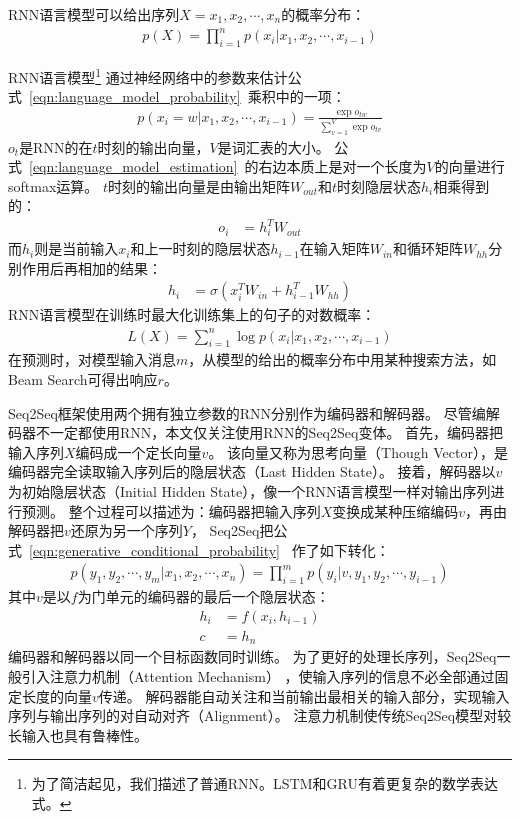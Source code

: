RNN语言模型可以给出序列$X=x_1, x_2, \cdots, x_n$的概率分布：
\begin{align}
    p(X) = \prod_{i=1}^{n} p(x_i|x_1, x_2, \cdots, x_{i-1})
    \label{eqn:language_model_probability}
\end{align}

RNN语言模型\footnote{为了简洁起见，我们描述了普通RNN。LSTM和GRU有着更复杂的数学表达式。}
通过神经网络中的参数来估计公式~\ref{eqn:language_model_probability}~乘积中的一项：
\begin{align}
    p(x_i = w|x_1, x_2, \cdots, x_{i-1}) = \frac{\exp{o_{tw}}}{\sum_{v=1}^V \exp{o_{tv}}}
    \label{eqn:language_model_estimation}
\end{align}
$o_t$是RNN的在$t$时刻的输出向量，$V$是词汇表的大小。
公式~\ref{eqn:language_model_estimation}~的右边本质上是对一个长度为$V$的向量进行softmax运算。
$t$时刻的输出向量是由输出矩阵$W_{out}$和$t$时刻隐层状态$h_i$相乘得到的：
\begin{align}
    o_i &= h_i^T W_{out}
\end{align}
而$h_i$则是当前输入$x_i$和上一时刻的隐层状态$h_{i-1}$在输入矩阵$W_{in}$和循环矩阵$W_{hh}$分别作用后再相加的结果：
\begin{align}
    h_i &= \sigma \left( x_i^T W_{in} + h_{i-1}^T W_{hh} \right)
\end{align}
RNN语言模型在训练时最大化训练集上的句子的对数概率：
\begin{align}
    \mathit{L(X)} = \sum_{i=1}^n \log p(x_i|x_1, x_2, \cdots, x_{i-1})
\end{align}
在预测时，对模型输入消息$m$，从模型的给出的概率分布中用某种搜索方法，如Beam Search可得出响应$r$。

Seq2Seq框架使用两个拥有独立参数的RNN分别作为编码器和解码器。
尽管编解码器不一定都使用RNN，本文仅关注使用RNN的Seq2Seq变体。
首先，编码器把输入序列$X$编码成一个定长向量$v$。
该向量又称为思考向量（Though Vector），是编码器完全读取输入序列后的隐层状态（Last Hidden State）。
接着，解码器以$v$为初始隐层状态（Initial Hidden State），像一个RNN语言模型一样对输出序列进行预测。
整个过程可以描述为：编码器把输入序列$X$变换成某种压缩编码$v$，再由解码器把$v$还原为另一个序列$Y$，
Seq2Seq把公式~\ref{eqn:generative_conditional_probability}~
作了如下转化：
\begin{align}
    p(y_1, y_2, \cdots, y_m|x_1, x_2, \cdots, x_n) = \prod_{i=1}^m p(y_i|v, y_1, y_2, \cdots, y_{i-1})
\end{align}
其中$v$是以$f$为门单元的编码器的最后一个隐层状态：
\begin{align}
    h_i &= f(x_i ,h_{i-1}) \\
    c &= h_n
\end{align}
编码器和解码器以同一个目标函数同时训练。
为了更好的处理长序列，Seq2Seq一般引入注意力机制（Attention Mechanism）
，使输入序列的信息不必全部通过固定长度的向量$v$传递。
解码器能自动关注和当前输出最相关的输入部分，实现输入序列与输出序列的对自动对齐（Alignment）。
注意力机制使传统Seq2Seq模型对较长输入也具有鲁棒性。

